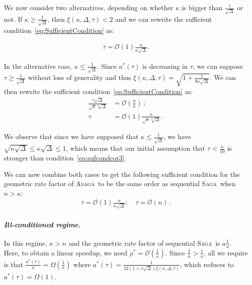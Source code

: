 \documentclass[twoside, 11pt]{article}
\newcommand{\overlap}{\tau}
\newcommand{\contraction}{\rho}
\newcommand{\sparsity}{\Delta}
\newcommand{\ASAGA}{\textsc{Asaga}}
\newcommand{\SAGA}{\textsc{Saga}}
\begin{document}
We now consider two alternatives, depending on whether $\kappa$ is bigger than $\frac{1}{\sqrt{\sparsity}}$ or not. If $\kappa \geq \frac{1}{\sqrt{\sparsity}}$, then $\xi(\kappa, \sparsity, \overlap) < 2$ and we can rewrite the sufficient condition~\eqref{eq:SufficientCondition} as:

\begin{align}
\overlap = \mathcal{O}(1) \frac{n}{\kappa\sqrt{\sparsity}}.
\end{align}

In the alternative case, $\kappa \leq \frac{1}{\sqrt{\sparsity}}$.
Since $a^*(\overlap)$ is decreasing in $\overlap$, we can suppose $\overlap \geq \frac{1}{\sqrt{\sparsity}}$ without loss of generality and thus $\xi(\kappa, \sparsity, \overlap) = \sqrt{1 + \frac{1}{8 \kappa \sqrt{\sparsity}}}$.
We can then rewrite the sufficient condition~\eqref{eq:SufficientCondition} as:
\begin{align}\label{eq:sufcondcor3}
\frac{\overlap \sqrt{\sparsity}}{\sqrt{\kappa}\sqrt[4]{\sparsity}} &= \mathcal{O}(\frac{n}{\kappa}) \,;
\nonumber \\
\overlap &= \mathcal{O}(1)\frac{n}{\sqrt{\kappa}\sqrt[4]{\sparsity}} \, .
\end{align}

We observe that since we have supposed that $\kappa \leq \frac{1}{\sqrt{\sparsity}}$, we have $\sqrt{\kappa \sqrt{\sparsity}} \leq \kappa \sqrt{\sparsity} \leq 1$, which means that our initial assumption that $\overlap < \frac{n}{10}$ is stronger than condition~\eqref{eq:sufcondcor3}.

We can now combine both cases to get the following sufficient condition for the geometric rate factor of \ASAGA\ to be the same order as sequential \SAGA\ when $n > \kappa$:
\begin{align}
\overlap = \mathcal{O}(1) \frac{n}{\kappa\sqrt{\sparsity}}; \quad
\overlap = \mathcal{O}(n) \, .
\end{align}

\paragraph{\textit{Ill-conditioned regime.}}
In this regime, $\kappa > n$ and the geometric rate factor of sequential \SAGA\ is $a \frac{1}{\kappa}$.
Here, to obtain a linear speedup, we need $\contraction^* = \mathcal{O}(\frac{1}{\kappa})$.
Since $\frac{1}{n} > \frac{1}{\kappa}$, all we require is that $\frac{a^*(\overlap)}{\kappa} = \Omega(\frac{1}{\kappa})$ where $a^*(\overlap) = \frac{1}{32 \left(1+ \overlap  \sqrt \sparsity \right) \xi(\kappa, \sparsity, \overlap)}$, which reduces to $a^*(\overlap) = \Omega(1)$.
\end{document}
